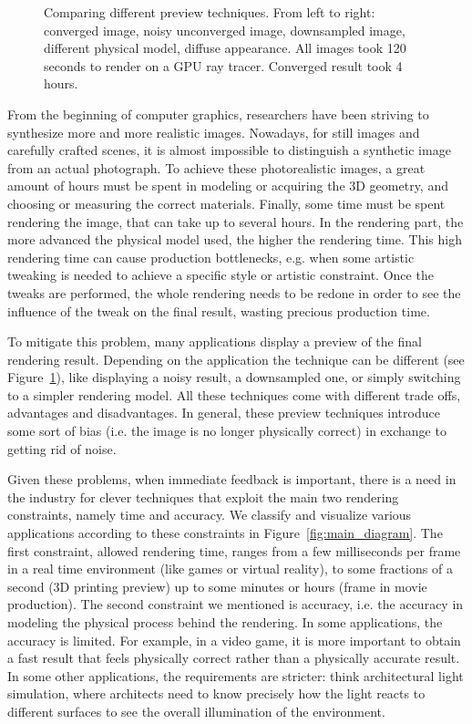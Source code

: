 \begin{figure}
\begin{tabular}{@{}c@{}c@{}c@{}c@{}c@{}}
\end{tabular}
\caption{Comparing different preview techniques. From left to right: converged image, noisy unconverged image, downsampled image, different physical model, diffuse appearance. All images took 120 seconds to render on a GPU ray tracer. Converged result took 4 hours.} 
\label{fig:comparison_convergence}
\end{figure}

From the beginning of computer graphics, researchers have been striving to synthesize more and more realistic images. Nowadays, for still images and carefully crafted scenes, it is almost impossible to distinguish a synthetic image from an actual photograph. To achieve these photorealistic images, a great amount of hours must be spent in modeling or acquiring the 3D geometry, and choosing or measuring the correct materials. Finally, some time must be spent rendering the image, that can take up to several hours. In the rendering part, the more advanced the physical model used, the higher the rendering time. This high rendering time can cause production bottlenecks, e.g. when some artistic tweaking is needed to achieve a specific style or artistic constraint. Once the tweaks are performed, the whole rendering needs to be redone in order to see the influence of the tweak on the final result, wasting precious production time. 

To mitigate this problem, many applications display a preview of the final rendering result. Depending on the application the technique can be different (see Figure~\ref{fig:comparison_convergence}), like displaying a noisy result, a downsampled one, or simply switching to a simpler rendering model. All these techniques come with different trade offs, advantages and disadvantages. In general, these preview techniques introduce some sort of bias (i.e. the image is no longer physically correct) in exchange to getting rid of noise. 

Given these problems, when immediate feedback is important, there is a need in the industry for clever techniques that exploit the main two rendering constraints, namely time and accuracy. We classify and visualize various applications according to these constraints in Figure~\ref{fig:main_diagram}. The first constraint, allowed rendering time, ranges from a few milliseconds per frame in a real time environment (like games or virtual reality), to some fractions of a second (3D printing preview) up to some minutes or hours (frame in movie production). The second constraint we mentioned is accuracy, i.e. the accuracy in modeling the physical process behind the rendering. In some applications, the accuracy is  limited. For example, in a video game, it is more important to obtain a fast result that feels physically correct rather than a physically accurate result. In some other applications, the requirements are stricter: think architectural light simulation, where architects need to know precisely how the light reacts to different surfaces to see the overall illumination of the environment. 


